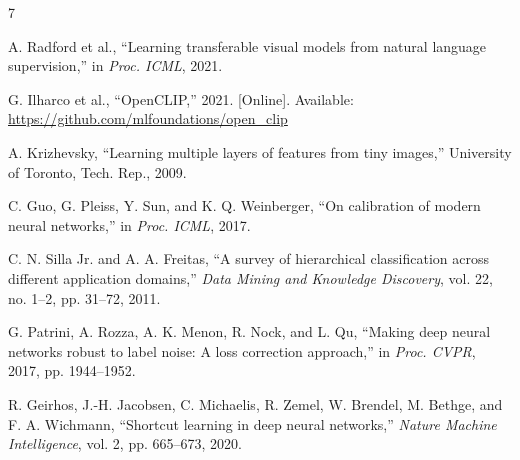 \documentclass[runningheads]{llncs}
\begin{document}
\begin{thebibliography}{7}

A. Radford et al., ``Learning transferable visual models from natural language
supervision,'' in \emph{Proc. ICML}, 2021.

G. Ilharco et al., ``OpenCLIP,'' 2021. [Online]. Available:
\url{https://github.com/mlfoundations/open_clip}

A. Krizhevsky, ``Learning multiple layers of features from tiny images,''
University of Toronto, Tech. Rep., 2009.

C. Guo, G. Pleiss, Y. Sun, and K. Q. Weinberger, ``On calibration of modern
neural networks,'' in \emph{Proc. ICML}, 2017.

C. N. Silla Jr. and A. A. Freitas, ``A survey of hierarchical classification
across different application domains,'' \emph{Data Mining and Knowledge
Discovery}, vol. 22, no. 1--2, pp. 31--72, 2011.

G. Patrini, A. Rozza, A. K. Menon, R. Nock, and L. Qu, ``Making deep neural
networks robust to label noise: A loss correction approach,'' in
\emph{Proc. CVPR}, 2017, pp. 1944--1952.

R. Geirhos, J.-H. Jacobsen, C. Michaelis, R. Zemel, W. Brendel, M. Bethge,
and F. A. Wichmann, ``Shortcut learning in deep neural networks,''
\emph{Nature Machine Intelligence}, vol. 2, pp. 665--673, 2020.

\end{thebibliography}
\end{document}
